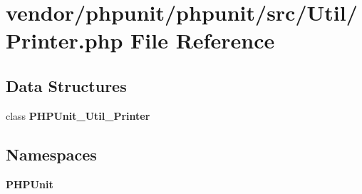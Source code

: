 \section{vendor/phpunit/phpunit/src/\+Util/\+Printer.php File Reference}
\label{_printer_8php}
\subsection*{Data Structures}
\begin{DoxyCompactItemize}
\item 
class {\bf P\+H\+P\+Unit\+\_\+\+Util\+\_\+\+Printer}
\end{DoxyCompactItemize}
\subsection*{Namespaces}
\begin{DoxyCompactItemize}
\item 
 {\bf P\+H\+P\+Unit}
\end{DoxyCompactItemize}
